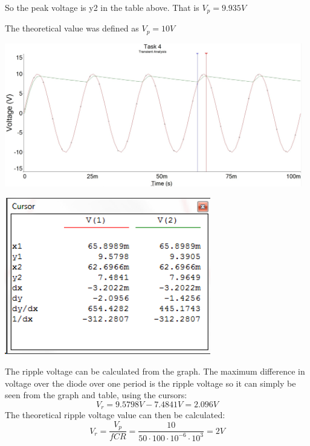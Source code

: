 \documentclass[11pt,a4paper]{article}
\begin{document}
\begin{enumerate}
    \vspace{2em}
        
    So the peak voltage is y2 in the table above. That is $V_p = 9.935 V$ 
    
    The theoretical value was defined as $V_p = 10 V$ \\
    
    \begin{minipage}{\linewidth}
    	\centering
        \includegraphics[width=13cm]{4_3.jpg}
    \end{minipage}
    
    \begin{minipage}{\linewidth}
    	\centering
        \includegraphics[width=9cm]{table_4_2.png}
    \end{minipage}
    
    \vspace{2em}
    
	The ripple voltage can be calculated from the graph. The maximum difference in voltage over the diode over one period is the ripple voltage so it can simply be seen from the graph and table, using the cursors: $$ V_r = 9.5798 V - 7.4841 V = 2.096 V$$
    The theoretical ripple voltage value can then be calculated: $$ V_r = \dfrac{V_p}{fCR} = \dfrac{10}{50 \cdot 100 \cdot 10^{-6} \cdot 10^3} = 2 V$$
  

\end{enumerate}
\end{document}
